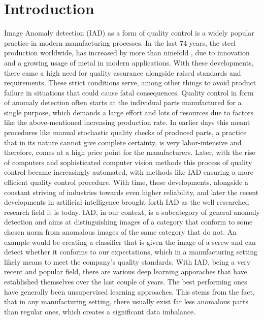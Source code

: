 \chapter{Introduction}
\label{chap:introduction}

Image Anomaly detection (IAD) as a form of quality control is a widely popular practice in modern manufacturing processes. In the last 74 years, the steel production worldwide, 
has increased by more than ninefold \cite{worldsteel}, due to innovation and a growing usage of metal in modern applications. 
With these developments, there came a high need for quality 
assurance alongside raised standards and requirements. These strict conditions serve, among other things 
to avoid product failure in situations that could cause fatal consequences. Quality control in form of anomaly detection often 
starts at the individual parts manufactured for a single purpose, which demands a large effort and lots of resources due to factors like 
the above-mentioned increasing production rate. 
In earlier days this meant procedures like manual stochastic quality checks of produced parts, a practice that in its nature cannot give 
complete certainty, is very labor-intensive and therefore, comes at a high price point for the manufacturers. Later, with the rise of computers and sophisticated computer vision methods 
this process of quality control became increasingly automated, with methods like IAD ensuring a more efficient quality control procedure. With time, these developments, 
alongside a constant striving of industries towards even higher reliability, and later the recent developments in artificial intelligence brought forth IAD as the 
well researched research field it is today.\newline 
IAD, in our context, is a subcategory of general anomaly detection 
and aims at distinguishing images of a category that conform to some chosen norm from anomalous images of the same category that do not. 
An example would be creating a classifier that is given the image of a screw and can detect whether it conforms to our expectations, 
which in a manufacturing setting likely means to meet the company's quality standards.
\newline
With IAD, being a very recent and popular field, there are various deep learning apporaches that have established themselves over 
the last couple of years. The best performing ones have generally been unsupervised learning approaches. This stems from the fact, that 
in any manufacturing setting, there usually exist far less anomalous parts than regular ones, which creates a significant data imbalance. 

